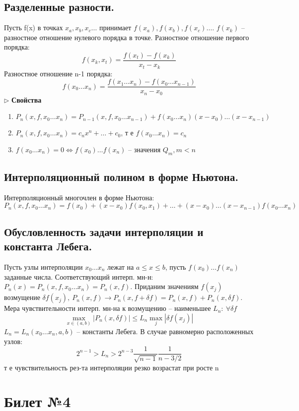 \documentclass[a4paper]{article}
\begin{document}
\subsection{Разделенные разности.}
Пусть f(x) в точках $x_a, x_b, x_c \ldots$ принимает $f(x_a), f(x_b), f(x_c) \ldots$. $f(x_k)$ – разностное отношение нулевого порядка в точке. Разностное отношение первого порядка: $$ f(x_k,x_t) = \frac{f(x_t) - f(x_k)}{x_t - x_k}$$
Разностное отношение n-1 порядка: $$ f(x_0 \ldots x_n) = \frac{f(x_1 \ldots x_n) - f(x_0 \ldots x_{n-1})}{x_n - x_0}$$
$\triangleright$ \textbf{Свойства}
\begin{enumerate}
	\item $P_n(x,f,x_0 \ldots x_n) = P_{n-1}(x,f,x_0 \ldots x_{n-1}) + f(x_0 \ldots x_n)(x-x_0)\ldots (x-x_{n-1})$
	\item $P_n(x,f,x_0 \ldots x_n) = c_nx^n + \ldots + c_0$, т е $f(x_0 \ldots x_n) = c_n$
	\item $f(x_0 \ldots x_n)=0 \iff f(x_0) \ldots f(x_n)$ – значения $Q_m, m<n$
\end{enumerate}
\subsection{Интерполяционный полином в форме Ньютона.}
Интерполяционный многочлен в форме Ньютона: $$P_n(x, f, x_0 \ldots x_n) = f(x_0) + (x-x_0)f(x_0,x_1) + \ldots + (x-x_0)\ldots (x-x_{n-1})f(x_0 \ldots x_n) $$
\subsection{Обусловленность задачи интерполяции и константа Лебега.}
Пусть узлы интерполяции $x_0 \ldots x_n$ лежат на $a \leq x \leq b$, пусть $f(x_0) \ldots f(x_n)$ заданные числа. Соответствующий интерп. мн-н: $P_n(x) = P_n(x,f,x_0 \ldots x_n) = P_n(x,f)$. Приданим значениям $f(x_j)$ возмущение $\delta f(x_j), \ P_n(x,f) \rightarrow P_n(x, f + \delta f) = P_n(x,f) + P_n(x, \delta f)$.
Мера чувствительности интерп. мн-на к возмущению – наименьшее $L_n: \ \forall \delta f$ $$\max_{x \in (a,b)} |P_n(x,\delta f)| \leq L_n \max_{j} |\delta f(x_j)|$$
$L_n = L_n(x_0 \ldots x_n,a,b)$ – константы Лебега. В случае равномерно расположенных узлов: $$2^{n-1} > L_n > 2^{n-3} \frac{1}{\sqrt{n-1}} \frac{1}{n-3/2} $$ т е чувствительность рез-та интерполяции резко возрастат при росте n  

\section{Билет №4}
\end{document}
